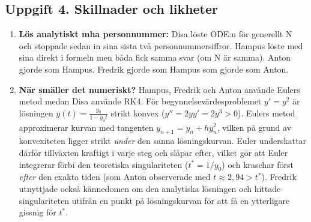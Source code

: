 \documentclass{article}
\begin{document}
\subsection*{Uppgift 4. Skillnader och likheter}

\begin{enumerate}
    \item \textbf{Lös analytiskt mha personnummer:} Disa löste ODE:n för generellt N och stoppade sedan in sina sista två personnummersiffror. Hampus löste med sina direkt i formeln men båda fick samma svar (om N är samma). Anton gjorde som Hampus. Fredrik gjorde som Hampus som gjorde som Anton.
    \item \textbf{När smäller det numeriskt?} 
    Hampus, Fredrik och Anton använde Eulers metod medan Disa använde RK4. För begynnelsevärdesproblemet $y' = y^2$ är lösningen $y(t) = \frac{y_0}{1 - y_0 t}$ strikt konvex ($y'' = 2y y' = 2y^3 > 0$). Eulers metod approximerar kurvan med tangenten $y_{n+1} = y_n + h y_n^2$, vilken på grund av konvexiteten ligger strikt \emph{under} den sanna lösningskurvan. Euler underskattar därför tillväxten kraftigt i varje steg och släpar efter, vilket gör att Euler integrerar förbi den teoretiska singulariteten ($t^* = 1/y_0$) och kraschar först \emph{efter} den exakta tiden (som Anton observerade med $t \approx 2{,}94 > t^*$). Fredrik utnyttjade också kännedomen om den analytiska lösningen och hittade singulariteten utifrån en punkt på lösningskurvan för att få en ytterligare gissnig för $t^*$. 

    \bigskip


\end{enumerate}
\end{document}
